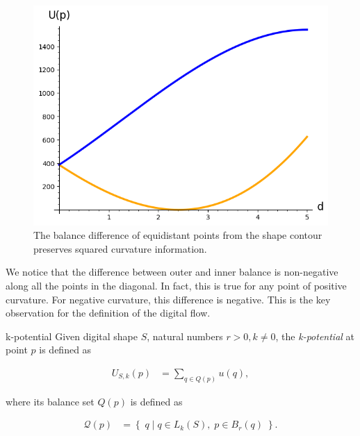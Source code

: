 \begin{figure}[h!]
\begin{minipage}{0.25\textwidth}
\end{minipage}%
\begin{minipage}{0.75\textwidth}
\includegraphics[scale=0.75]{figures/appendix-potential-elastica/potential-elastica-plot.png}
\end{minipage}
\caption{The balance difference of equidistant points from the shape contour preserves squared curvature information.}
\label{fig:balance-plot}
\end{figure}


We notice that the difference between outer and inner balance is non-negative along all the points in the diagonal. In fact, this is true for any point of positive curvature. For negative curvature, this difference is negative. This is the key observation for the definition of the digital flow.

\begin{definition}{k-potential}
Given digital shape $S$, natural numbers $r>0, k \neq 0$, the \emph{k-potential} at point $p$ is defined as

\begin{align*}
	U_{S,k}(p) &= \sum_{q \in Q(p)}{ u(q),}
\end{align*}

where its balance set $Q(p)$ is defined as

\begin{align*}
	\mathcal{Q}(p) &= \left\{\; q \; | \; q \in L_k(S),\; p \in B_r(q) \; \right\}.
\end{align*}

\end{definition}

